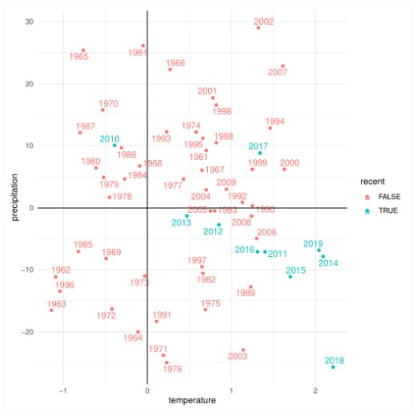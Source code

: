 \documentclass[
]{article}
\begin{document}
\includegraphics{notebook_files/figure-latex/all_years-1.pdf}
\end{document}
